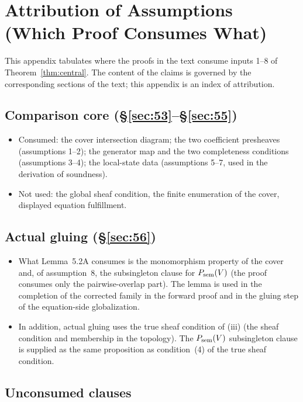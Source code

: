 \appendix

\section{Attribution of Assumptions (Which Proof Consumes What)}\label{app:A}

This appendix tabulates where the proofs in the text consume inputs
1--8 of Theorem~\ref{thm:central}. The content of the claims is
governed by the corresponding sections of the text; this appendix is an
index of attribution.

\subsection{Comparison core (\S\ref{sec:53}--\S\ref{sec:55})}\label{app:A1}

\begin{itemize}
\item Consumed: the cover intersection diagram; the two coefficient
presheaves (assumptions 1--2); the generator map and the two
completeness conditions (assumptions 3--4); the local-state data
(assumptions 5--7, used in the derivation of soundness).
\item Not used: the global sheaf condition, the finite enumeration of
the cover, displayed equation fulfillment.
\end{itemize}

\subsection{Actual gluing (\S\ref{sec:56})}\label{app:A2}

\begin{itemize}
\item What Lemma~5.2A consumes is the monomorphism property of the
cover and, of assumption~8, the subsingleton clause for $P_{\mathrm{sem}}(V)$
(the proof consumes only the pairwise-overlap part). The lemma is used
in the completion of the corrected family in the forward proof and in
the gluing step of the equation-side globalization.
\item In addition, actual gluing uses the true sheaf condition of
(iii) (the sheaf condition and membership in the topology). The
$P_{\mathrm{sem}}(V)$ subsingleton clause is supplied as the same proposition as
condition~(4) of the true sheaf condition.
\end{itemize}

\subsection{Unconsumed clauses}\label{app:A3}

